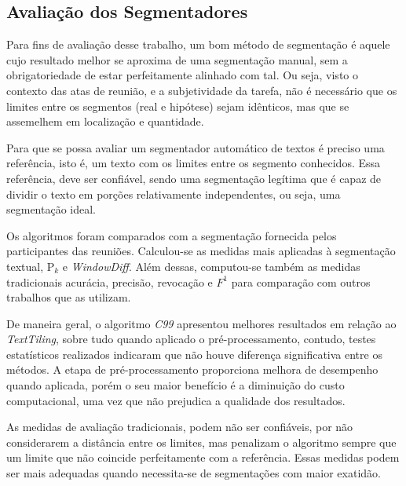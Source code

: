 





\subsection{Avaliação dos Segmentadores}




Para fins de avaliação desse trabalho, um bom método de segmentação é aquele cujo resultado melhor se aproxima de uma segmentação manual, sem a obrigatoriedade de estar perfeitamente alinhado com tal. Ou seja, visto o contexto das atas de reunião, e a subjetividade da tarefa, não é necessário que os limites entre os segmentos (real e hipótese) sejam idênticos, mas que se assemelhem em localização e quantidade.

Para que se possa avaliar um segmentador automático de textos é preciso uma referência, isto é, um texto com os limites entre os segmento conhecidos. Essa referência, deve ser confiável, sendo uma segmentação legítima que é capaz de dividir o texto em porções relativamente independentes, ou seja, uma segmentação ideal.

Os algoritmos foram comparados com a segmentação fornecida pelos participantes das reuniões. Calculou-se as medidas mais aplicadas à segmentação textual, P$_k$ e \textit{WindowDiff}. Além dessas, computou-se também as medidas tradicionais acurácia, precisão, revocação e $F^1$ para comparação com outros trabalhos que as utilizam.




De maneira geral, o algoritmo \textit{C99} apresentou melhores resultados em relação ao \textit{TextTiling}, sobre tudo quando aplicado o pré-processamento, contudo, testes estatísticos realizados indicaram que não houve diferença significativa entre os métodos. A etapa de pré-processamento proporciona melhora de desempenho quando aplicada, porém o seu maior benefício é a diminuição do custo computacional, uma vez que não prejudica a qualidade dos resultados.


As medidas de avaliação tradicionais, podem não ser confiáveis, por não considerarem a distância entre os limites, mas penalizam o algoritmo sempre que um limite que não coincide perfeitamente com a referência. Essas medidas podem ser mais adequadas quando necessita-se de segmentações com maior exatidão. 


